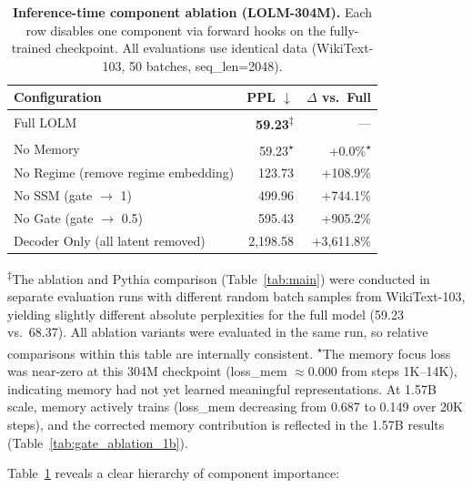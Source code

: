 \documentclass{article}
\begin{document}
\begin{table}[t]
\centering
\caption{\textbf{Inference-time component ablation (LOLM-304M).} Each row
disables one component via forward hooks on the fully-trained checkpoint.
All evaluations use identical data (WikiText-103, 50 batches, seq\_len=2048).}
\label{tab:ablation}
\vspace{0.5em}
\begin{tabular}{lrr}
\toprule
\textbf{Configuration} & \textbf{PPL} $\downarrow$ & \textbf{$\Delta$ vs.\ Full} \\
\midrule
Full LOLM & \textbf{59.23}\textsuperscript{$\ddagger$} & --- \\
No Memory & 59.23\textsuperscript{$\star$} & +0.0\%\textsuperscript{$\star$} \\
No Regime (remove regime embedding) & 123.73 & +108.9\% \\
No SSM (gate $\to$ 1) & 499.96 & +744.1\% \\
No Gate (gate $\to$ 0.5) & 595.43 & +905.2\% \\
Decoder Only (all latent removed) & 2,198.58 & +3,611.8\% \\
\bottomrule
\end{tabular}

{\footnotesize \textsuperscript{$\ddagger$}The ablation and Pythia comparison
(Table~\ref{tab:main}) were conducted in separate evaluation runs with different
random batch samples from WikiText-103, yielding slightly different absolute
perplexities for the full model (59.23 vs.\ 68.37). All ablation variants were
evaluated in the same run, so relative comparisons within this table are
internally consistent.
\textsuperscript{$\star$}The memory focus loss was near-zero at this
304M checkpoint (loss\_mem $\approx 0.000$ from steps 1K--14K), indicating memory
had not yet learned meaningful representations. At 1.57B scale, memory actively
trains (loss\_mem decreasing from 0.687 to 0.149 over 20K steps),
and the corrected memory contribution is reflected in the 1.57B results
(Table~\ref{tab:gate_ablation_1b}).}
\end{table}

Table~\ref{tab:ablation} reveals a clear hierarchy of component importance:
\end{document}
